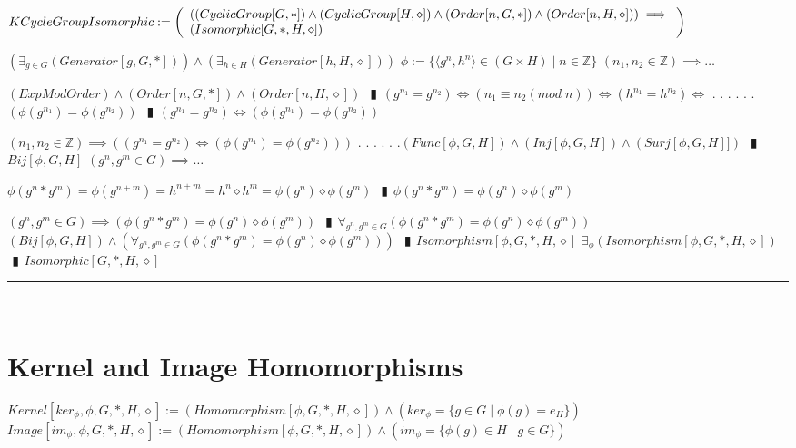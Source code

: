 \documentclass{book}
\newcommand{\abr}{:=}
\newcommand{\cont}{\phantom{.}. . .\phantom{.}}
\newcommand{\pipe}{$\phantom{(}\vrectangleblack\phantom{)}$}
\newcommand{\st}{\mathbin{|}}
\begin{document}
$KCycleGroupIsomorphic \abr \left(\begin{array}{ll}
  ((CyclicGroup[G, *]) \hfill \land \hfill (CyclicGroup[H, \diamond]) \hfill \land \hfill (Order[n, G, *]) \hfill \land \hfill (Order[n, H, \diamond])) \hfill \implies \hfill \\
  (Isomorphic[G, *, H, \diamond])
\end{array}\right)$
\begin{enumerate}
  \lit $(\exists_{g \in G}(Generator[g, G, *])) \land (\exists_{h \in H}(Generator[h, H, \diamond]))$
  \lit $\phi \abr \{\langle g^n, h^n \rangle \in (G \times H) \st n \in \mathbb{Z}\}$
  \lit $(n_1, n_2 \in \mathbb{Z}) \implies \ldots$
  \begin{enumerate}
    \lit $(ExpModOrder) \land (Order[n, G, *]) \land (Order[n, H, \diamond])$ \pipe $(g^{n_1} = g^{n_2}) \iff (n_1 \equiv n_2 (mod \phantom{.} n)) \iff (h^{n_1} = h^{n_2}) \iff$ \cont
    \lit \cont $(\phi(g^{n_1}) = \phi(g^{n_2}))$ \pipe $(g^{n_1} = g^{n_2}) \iff (\phi(g^{n_1}) = \phi(g^{n_2}))$
  \end{enumerate}
  \lit $(n_1, n_2 \in \mathbb{Z}) \implies ((g^{n_1} = g^{n_2}) \iff (\phi(g^{n_1}) = \phi(g^{n_2})))$ \cont
  \lit \cont $(Func[\phi, G, H]) \land (Inj[\phi, G, H]) \land (Surj[\phi, G, H]])$ \pipe $Bij[\phi, G, H]$ %
  \lit $(g^n, g^m \in G) \implies \ldots$
  \begin{enumerate}
    \lit $\phi(g^n * g^m) = \phi(g^{n + m}) = h^{n + m} = h^n \diamond h^m = \phi(g^n) \diamond \phi(g^m)$ \pipe $\phi(g^n * g^m) = \phi(g^n) \diamond \phi(g^m)$
  \end{enumerate}
  \lit $(g^n, g^m \in G) \implies (\phi(g^n * g^m) = \phi(g^n) \diamond \phi(g^m))$ \pipe $\forall_{g^n, g^m \in G}(\phi(g^n * g^m) = \phi(g^n) \diamond \phi(g^m))$
  \lit $(Bij[\phi, G, H]) \land (\forall_{g^n, g^m \in G}(\phi(g^n * g^m) = \phi(g^n) \diamond \phi(g^m)))$ \pipe $Isomorphism[\phi, G, *, H, \diamond]$
  \lit $\exists_{\phi}(Isomorphism[\phi, G, *, H, \diamond])$ \pipe $Isomorphic[G, *, H, \diamond]$
\end{enumerate} \vspace{.75mm} \hrule \vspace{.75mm} \ \\ 

\section{Kernel and Image Homomorphisms}
$Kernel[ker_\phi, \phi, G, *, H, \diamond] \abr (Homomorphism[\phi, G, *, H, \diamond]) \land (ker_\phi = \{g \in G \st \phi(g) = e_H\})$ \\
$Image[im_\phi, \phi, G, *, H, \diamond] \abr (Homomorphism[\phi, G, *, H, \diamond]) \land (im_\phi = \{\phi(g) \in H \st g \in G\})$ \\
\end{document}
